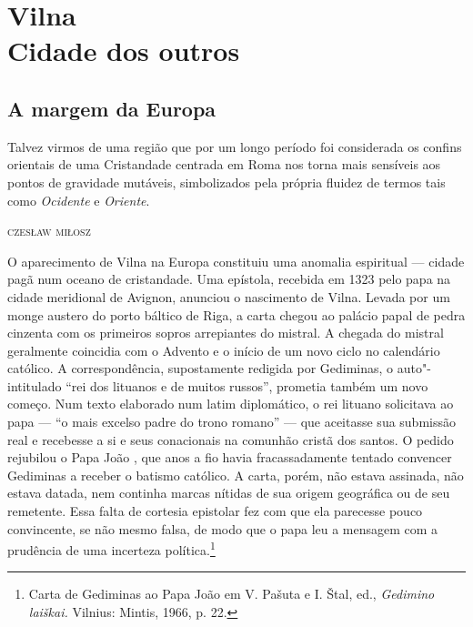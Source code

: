 %

\part[Vilna: cidade dos outros]{Vilna\\ Cidade dos outros}

\chapter{A margem da Europa}

\epigraph{Talvez virmos de uma região que por um longo período foi considerada os
confins orientais de uma Cristandade centrada em Roma nos torna mais
sensíveis aos pontos de gravidade mutáveis, simbolizados pela própria
fluidez de termos tais como \emph{Ocidente} e \emph{Oriente}.}{\textsc{czesław miłosz}}

O aparecimento de Vilna na Europa constituiu uma anomalia espiritual ---
cidade pagã num oceano de cristandade. Uma epístola, recebida em 1323
pelo papa na cidade meridional de Avignon, anunciou o nascimento de
Vilna. Levada por um monge austero do porto báltico de Riga, a carta
chegou ao palácio papal de pedra cinzenta com os primeiros sopros
arrepiantes do mistral. A chegada do mistral geralmente coincidia com o
Advento e o início de um novo ciclo no calendário católico. A
correspondência, supostamente redigida por Gediminas, o auto"-intitulado
``rei dos lituanos e de muitos russos'', prometia também um novo começo.
Num texto elaborado num latim diplomático, o rei lituano solicitava ao
papa --- ``o mais excelso padre do trono romano'' --- que aceitasse sua
submissão real e recebesse a si e seus conacionais na comunhão cristã
dos santos. O pedido rejubilou o Papa João , que anos a fio havia
fracassadamente tentado convencer Gediminas a receber o batismo
católico. A carta, porém, não estava assinada, não estava datada, nem
continha marcas nítidas de sua origem geográfica ou de seu remetente.
Essa falta de cortesia epistolar fez com que ela parecesse pouco
convincente, se não mesmo falsa, de modo que o papa leu a mensagem com a
prudência de uma incerteza política.\footnote{Carta de Gediminas ao Papa
  João  em V. Pašuta e I. Štal, ed., \emph{Gedimino laiškai.}
  Vilnius: Mintis, 1966, p. 22.}

